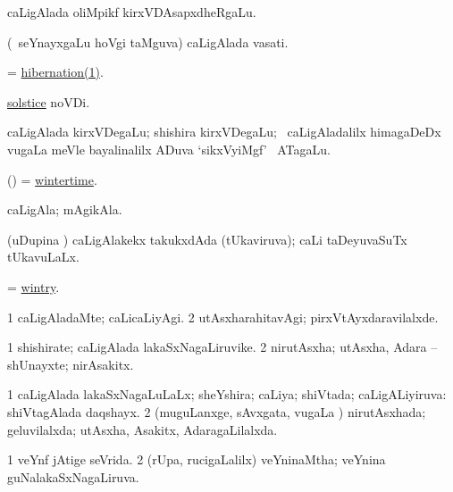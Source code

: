 \bentry
{}
\gl{\nA}
\bmng
caLigAlada oliMpikf kirxVDAsapxdheRgaLu. 
\emng
\eentry

\bentry
{}
\gl{\nA}
\bmng
(\kanmu\ seYnayxgaLu hoVgi taMguva) caLigAlada vasati. 
\emng
\eentry

\bentry
{}
\gl{\nA}
\bmng
= \hyperref{kandict_h.pdf}{H}{hibernation(1)}{hibernation(1)}. 
\emng
\eentry

\bentry
{}
\gl{\nA}
\bmng
\hyperref{kandict_s.pdf}{S}{solstice}{solstice} noVDi. 
\emng
\eentry

\bentry
{}
\gl{\nA}
\bmng
caLigAlada kirxVDegaLu; shishira kirxVDegaLu; \kanmu\ caLigAladalilx himagaDeDx \mo vugaLa meVle bayalinalilx ADuva `sikxVyiMgf' \mo\ ATagaLu. 
\emng
\eentry

\bentry
{}
\gl{\nA}
\bmng
(\kAparx) = \hyperlink{wintertime}{wintertime}. 
\emng
\eentry

\bentry
{}
\gl{\nA}
\bmng
caLigAla; mAgikAla. 
\emng
\eentry

\bentry
{}
\gl{\gu}
\bmng
(uDupina \vi) caLigAlakekx takukxdAda (tUkaviruva); caLi taDeyuvaSuTx tUkavuLaLx. 
\emng
\eentry

\bentry
{}
\gl{\gu}
\bmng
= \hyperlink{wintry}{wintry}. 
\emng
\eentry

\bentry
{}
\gl{\kirxvi}
\bmng
\bnum
\num{1} caLigAladaMte; caLicaLiyAgi. 
\num{2} utAsxharahitavAgi; pirxVtAyxdaravilalxde. 
\enum
\emng
\eentry

\bentry
{}
\gl{\nA}
\bmng
\bnum
\num{1} shishirate; caLigAlada lakaSxNagaLiruvike. 
\num{2} nirutAsxha; utAsxha, Adara -- shUnayxte; nirAsakitx. 
\enum
\emng
\eentry

\bentry
{}
\gl{\gu} 
\bmng
\bnum
\num{1} caLigAlada lakaSxNagaLuLaLx; sheYshira; caLiya; shiVtada; caLigALiyiruva:  shiVtagAlada daqshayx. 
\num{2} (muguLanxge, sAvxgata, \mo vugaLa \vi) nirutAsxhada; geluvilalxda; utAsxha, Asakitx, AdaragaLilalxda. 
\enum
\emng
\eentry

\bentry
{}
\gl{\gu} 
\bmng
\bnum
\num{1} veYnf jAtige seVrida. 
\num{2} (rUpa, rucigaLalilx) veYninaMtha; veYnina guNalakaSxNagaLiruva. 
\enum
\emng
\eentry

